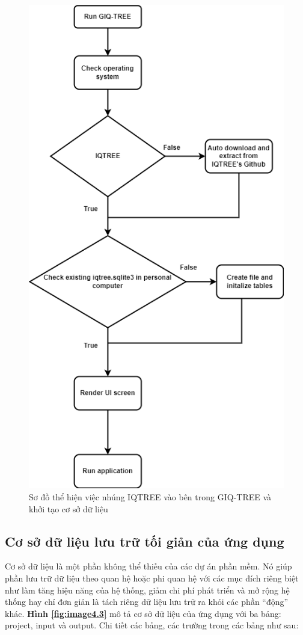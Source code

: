 \documentclass[12pt]{report}
\begin{document}
\begin{figure}[h]
	\centering
	\includegraphics[scale=0.65]{Image/4.2.png}
	\caption{Sơ đồ thể hiện việc nhúng IQTREE vào bên trong GIQ-TREE và khởi tạo cơ sở dữ liệu }
	\label{fig:image4.2}
\end{figure}

\subsection{Cơ sở dữ liệu lưu trữ tối giản của ứng dụng}
Cơ sở dữ liệu là một phần không thể thiếu của các dự án phần mềm. Nó giúp phần lưu trữ dữ liệu theo quan hệ hoặc phi quan hệ với các mục đích riêng biệt như làm tăng hiệu năng của hệ thống, giảm chi phí phát triển và mở rộng hệ thống hay chỉ đơn giản là tách riêng dữ liệu lưu trữ ra khỏi các phần “động” khác.  \textbf{Hình \ref{fig:image4.3}} mô tả cơ sở dữ liệu của ứng dụng với ba bảng: project, input và output. Chi tiết các bảng, các trường trong các bảng như sau: 
\end{document}
